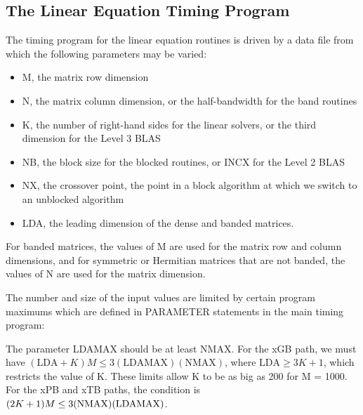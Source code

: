 \subsection{The Linear Equation Timing Program}
\dent
The timing program for the linear equation routines is driven by a
data file from which the following parameters may be varied:

\begin{itemize}
\item M, the matrix row dimension
\item N, the matrix column dimension, or the half-bandwidth for the band
routines
\item K, the number of right-hand sides for the linear solvers, or the 
third dimension for the Level 3 BLAS
\item NB, the block size for the blocked routines, or INCX for the Level
2 BLAS
\item NX, the crossover point, the point in a block algorithm at which
we switch to an unblocked algorithm
\item LDA, the leading dimension of the dense and banded matrices.
\end{itemize}

\noindent
For banded matrices, the values of M are used for the
matrix row and column dimensions, and for symmetric or Hermitian
matrices that are not banded, the values of N are used for
the matrix dimension.

The number and size of the input values are limited by certain program
maximums which are defined in PARAMETER statements in the
main timing program:

The parameter LDAMAX should be at least NMAX.
For the xGB path, we must have
$(\mbox{LDA} + K) M \leq 3 (\mbox{LDAMAX}) (\mbox{NMAX})$, where
$\mbox{LDA} \geq 3K+1$, 
which restricts the value of K. 
These limits allow K to be as big as 200 for M = 1000.
For the xPB and xTB paths, the condition is
$(2K+1) M \leq 3 ({\rm NMAX})({\rm LDAMAX})$.

